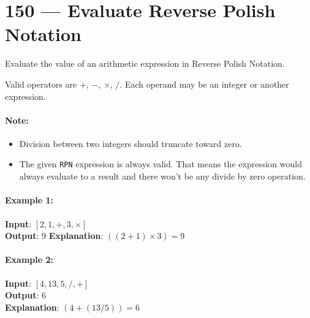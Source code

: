 \section{150 --- Evaluate Reverse Polish Notation}
Evaluate the value of an arithmetic expression in Reverse Polish Notation.
\par
Valid operators are $+$, $-$, $\times$, $/$. Each operand may be an integer or another expression.
\paragraph{Note:}
\begin{itemize}
    \item Division between two integers should truncate toward zero.
    \item The given \texttt{RPN} expression is always valid. That means the expression would always evaluate to a result and there won't be any divide by zero operation.
\end{itemize}
\paragraph{Example 1:}
\begin{flushleft}
\textbf{Input}: $[2, 1, +, 3, \times]$
\\
\textbf{Output}: 9
\textbf{Explanation}: $((2 + 1) \times 3) = 9$
\end{flushleft}
\paragraph{Example 2:}
\begin{flushleft}
\textbf{Input}: $[4, 13, 5, /, +]$
\\
\textbf{Output}: 6
\\
\textbf{Explanation}: $(4 + (13 / 5)) = 6$
\end{flushleft}
